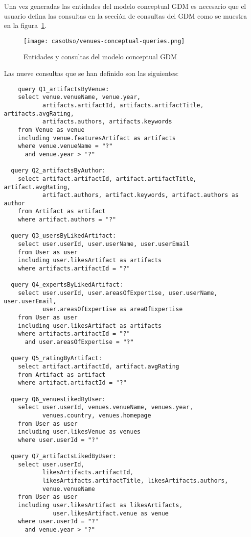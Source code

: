 Una vez generadas las entidades del modelo conceptual GDM es necesario que el usuario defina las consultas en la sección de consultas del GDM como se muestra en la figura~\ref{img:venues-conceptual-queries}.

\begin{figure}[H]
    \centering
    \texttt{[image: casoUso/venues-conceptual-queries.png]}
    \caption{Entidades y consultas del modelo conceptual GDM}
    \label{img:venues-conceptual-queries}
\end{figure}

Las nueve consultas que se han definido son las siguientes:

\begin{verbatim}
    query Q1_artifactsByVenue:
    select venue.venueName, venue.year,
           artifacts.artifactId, artifacts.artifactTitle, artifacts.avgRating,
           artifacts.authors, artifacts.keywords
    from Venue as venue
    including venue.featuresArtifact as artifacts
    where venue.venueName = "?"
      and venue.year > "?"
  
  query Q2_artifactsByAuthor:
    select artifact.artifactId, artifact.artifactTitle, artifact.avgRating,
           artifact.authors, artifact.keywords, artifact.authors as author
    from Artifact as artifact
    where artifact.authors = "?"
  
  query Q3_usersByLikedArtifact:
    select user.userId, user.userName, user.userEmail
    from User as user
    including user.likesArtifact as artifacts
    where artifacts.artifactId = "?"
  
  query Q4_expertsByLikedArtifact:
    select user.userId, user.areasOfExpertise, user.userName, user.userEmail,
           user.areasOfExpertise as areaOfExpertise
    from User as user
    including user.likesArtifact as artifacts
    where artifacts.artifactId = "?"
      and user.areasOfExpertise = "?"
  
  query Q5_ratingByArtifact:
    select artifact.artifactId, artifact.avgRating
    from Artifact as artifact
    where artifact.artifactId = "?"
  
  query Q6_venuesLikedByUser:
    select user.userId, venues.venueName, venues.year,
           venues.country, venues.homepage
    from User as user
    including user.likesVenue as venues
    where user.userId = "?"
  
  query Q7_artifactsLikedByUser:
    select user.userId,
           likesArtifacts.artifactId,
           likesArtifacts.artifactTitle, likesArtifacts.authors,
           venue.venueName
    from User as user
    including user.likesArtifact as likesArtifacts,
              user.likesArtifact.venue as venue
    where user.userId = "?"
      and venue.year > "?"
  

\end{verbatim}
